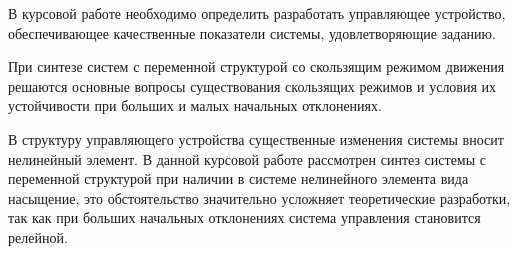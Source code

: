 В курсовой работе необходимо определить разработать управляющее устройство, обеспечивающее качественные показатели системы, удовлетворяющие заданию.

При синтезе систем с переменной структурой со скользящим режимом движения решаются основные вопросы существования скользящих режимов и условия их устойчивости при больших и малых начальных отклонениях. 

В структуру управляющего устройства существенные изменения системы вносит нелинейный элемент. В данной курсовой работе рассмотрен синтез системы с переменной структурой при наличии в системе нелинейного элемента вида насыщение, это обстоятельство значительно усложняет теоретические разработки, так как при больших начальных отклонениях система управления становится релейной.

